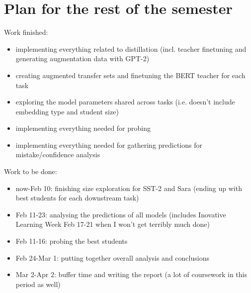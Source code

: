 \documentclass[bsc,frontabs,twoside,singlespacing,parskip,deptreport]{infthesis}
\begin{document}
\chapter{Plan for the rest of the semester}{
  Work finished:
  \begin{itemize}
    \item implementing everything related to distillation (incl. teacher finetuning and generating augmentation data with GPT-2)
    \item creating augmented transfer sets and finetuning the BERT teacher for each task
    \item exploring the model parameters shared across tasks (i.e. doesn't include embedding type and student size)
    \item implementing everything needed for probing
    \item implementing everything needed for gathering predictions for mistake/confidence analysis
  \end{itemize}

  Work to be done:
  \begin{itemize}
    \item now-Feb 10: finishing size exploration for SST-2 and Sara (ending up with best students for each downstream task)
    \item Feb 11-23: analysing the predictions of all models (includes Inovative Learning Week Feb 17-21 when I won't get terribly much done)
    \item Feb 11-16: probing the best students
    \item Feb 24-Mar 1: putting together overall analysis and conclusions
    \item Mar 2-Apr 2: buffer time and writing the report (a lot of coursework in this period as well)
  \end{itemize}
}

\end{document}

